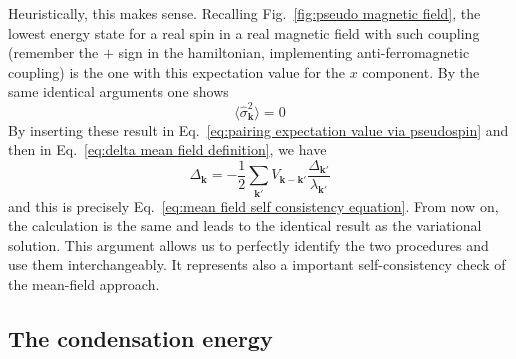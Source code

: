 Heuristically, this makes sense. Recalling Fig.~\ref{fig:pseudo magnetic field}, the lowest energy state for a real spin in a real magnetic field with such coupling (remember the $+$ sign in the hamiltonian, implementing anti-ferromagnetic coupling) is the one with this expectation value for the $x$ component. By the same identical arguments one shows
\[
	\big\langle \hat{\sigma}_\mathbf{k}^2 \big\rangle = 0
\]
By inserting these result in Eq.~\eqref{eq:pairing expectation value via pseudospin} and then in Eq.~\eqref{eq:delta mean field definition}, we have
\[
	\Delta_\mathbf{k} = - \frac{1}{2} \sum_{\mathbf{k}'} V_{\mathbf{k}-\mathbf{k}'}  \frac{\Delta_{\mathbf{k}'}}{\lambda_{\mathbf{k}'}}
\]
and this is precisely Eq.~\eqref{eq:mean field self consistency equation}. From now on, the calculation is the same and leads to the identical result as the variational solution. This argument allows us to perfectly identify the two procedures and use them interchangeably. It represents also a important self-consistency check of the mean-field approach.

\subsection{The condensation energy}


